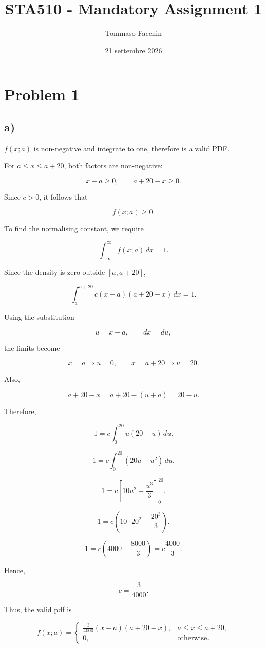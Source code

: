\documentclass[
  11pt,
]{article}
\title{STA510 - Mandatory Assignment 1}
\author{Tommaso Facchin}
\date{21 settembre 2026}
\begin{document}
\maketitle

{
\setcounter{tocdepth}{2}
\tableofcontents
}
\section{Problem 1}\label{problem-1}

\subsection{a)}\label{a}

\(f(x;a)\) is non-negative and integrate to one, therefore is a valid
PDF.

For \(a \leq x \leq a+20\), both factors are non-negative:

\[
x-a \geq 0,
\qquad
a+20-x \geq 0.
\]

Since \(c > 0\), it follows that

\[
f(x;a) \geq 0.
\]

To find the normalising constant, we require

\[
\int_{-\infty}^{\infty} f(x;a)\,dx = 1.
\]

Since the density is zero outside \([a,a+20]\),

\[
\int_a^{a+20} c(x-a)(a+20-x)\,dx = 1.
\]

Using the substitution

\[
u = x-a,
\qquad
dx = du,
\]

the limits become

\[
x=a \Rightarrow u=0,
\qquad
x=a+20 \Rightarrow u=20.
\]

Also,

\[
a+20-x = a+20-(u+a)=20-u.
\]

Therefore,

\[
1 = c\int_0^{20}u(20-u)\,du.
\]

\[
1 = c\int_0^{20}(20u-u^2)\,du.
\]

\[
1 = c\left[10u^2-\frac{u^3}{3}\right]_0^{20}.
\]

\[
1 = c\left(10\cdot20^2-\frac{20^3}{3}\right).
\]

\[
1 = c\left(4000-\frac{8000}{3}\right)
  = c\frac{4000}{3}.
\]

Hence,

\[
\boxed{c=\frac{3}{4000}}.
\]

Thus, the valid pdf is

\[
f(x;a)=
\begin{cases}
\displaystyle \frac{3}{4000}(x-a)(a+20-x),
& a \leq x \leq a+20,\\[6pt]
0, & \text{otherwise}.
\end{cases}
\]
\end{document}
